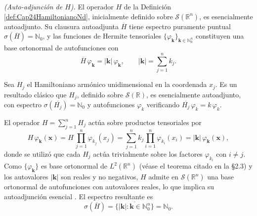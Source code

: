             \begin{proposition}\label{prop:Cap24Hautoadjunto}
                \textit{(Auto-adjunción de $H$).} El operador $H$ de la Definición \ref{def:Cap24HamiltonianoNd}, inicialmente definido sobre $\mathcal{S}(\mathbb{R}^n)$, es esencialmente autoadjunto. Su clausura autoadjunta $\overline{H}$ tiene espectro puramente puntual $\sigma(\overline{H}) = \mathbb{N}_0$, y las funciones de Hermite tensoriales $\{\varphi_{\boldsymbol{k}}\}_{\boldsymbol{k}\in\mathbb{N}_0^n}$ constituyen una base ortonormal de autofunciones con
                \begin{equation}\label{eq:Cap24EspectroH}
                    \overline{H}\,\varphi_{\boldsymbol{k}} = |\boldsymbol{k}|\,\varphi_{\boldsymbol{k}}, \qquad |\boldsymbol{k}| = \sum_{j=1}^n k_j.
                \end{equation}
            \end{proposition}
            \begin{Proof}
                Sea $H_j$ el Hamiltoniano armónico unidimensional en la coordenada $x_j$. Es un resultado clásico \citep[Thm. X.28]{reed1980methods} que $H_j$, definido sobre $\mathcal{S}(\mathbb{R})$, es esencialmente autoadjunto, con espectro $\sigma(\overline{H_j}) = \mathbb{N}_0$ y autofunciones $\varphi_{k}$ verificando $\overline{H_j}\,\varphi_{k} = k\,\varphi_{k}$.

                El operador $H = \sum_{j=1}^n H_j$ actúa sobre productos tensoriales por
                \begin{equation*}
                    H\,\varphi_{\boldsymbol{k}}(\mathbf{x}) = H\,\prod_{j=1}^n \varphi_{k_j}(x_j) = \sum_{j=1}^n k_j \prod_{i=1}^n \varphi_{k_i}(x_i) = |\boldsymbol{k}|\,\varphi_{\boldsymbol{k}}(\mathbf{x}),
                \end{equation*}
                donde se utilizó que cada $H_j$ actúa trivialmente sobre los factores $\varphi_{k_i}$ con $i\neq j$. Como $\{\varphi_{\boldsymbol{k}}\}$ es base ortonormal de $L^2(\mathbb{R}^n)$ (véase el teorema citado en la §2.3) y los autovalores $|\boldsymbol{k}|$ son reales y no negativos, $H$ admite en $\mathcal{S}(\mathbb{R}^n)$ una base ortonormal de autofunciones con autovalores reales, lo que implica su autoadjunción esencial \citep[Thm. VIII.11]{reed1980methods}. El espectro resultante es
                \begin{equation*}
                    \sigma(\overline{H}) = \overline{\{|\boldsymbol{k}| : \boldsymbol{k}\in \mathbb{N}_0^n\}} = \mathbb{N}_0.
                \end{equation*}
            \end{Proof}

